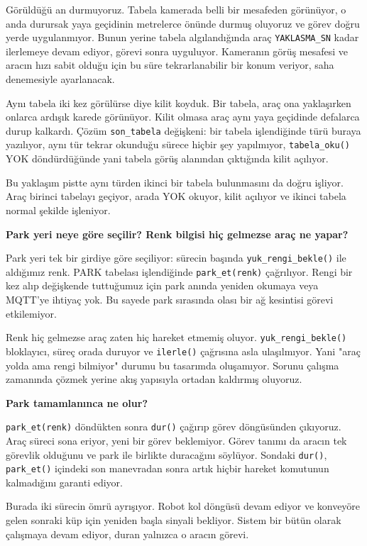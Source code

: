 \documentclass[11pt,a4paper]{article}
\newcommand{\ey}[1]{\texttt{#1}}
\begin{document}
Görüldüğü an durmuyoruz. Tabela kamerada belli bir mesafeden görünüyor, o anda
durursak yaya geçidinin metrelerce önünde durmuş oluyoruz ve görev doğru yerde
uygulanmıyor. Bunun yerine tabela algılandığında araç \ey{YAKLASMA\_SN} kadar
ilerlemeye devam ediyor, görevi sonra uyguluyor. Kameranın görüş mesafesi ve
aracın hızı sabit olduğu için bu süre tekrarlanabilir bir konum veriyor, saha
denemesiyle ayarlanacak.

Aynı tabela iki kez görülürse diye kilit koyduk. Bir tabela, araç ona
yaklaşırken onlarca ardışık karede görünüyor. Kilit olmasa araç aynı yaya
geçidinde defalarca durup kalkardı. Çözüm \ey{son\_tabela} değişkeni: bir
tabela işlendiğinde türü buraya yazılıyor, aynı tür tekrar okunduğu sürece
hiçbir şey yapılmıyor, \ey{tabela\_oku()} YOK döndürdüğünde yani tabela görüş
alanından çıktığında kilit açılıyor.

Bu yaklaşım pistte aynı türden ikinci bir tabela bulunmasını da doğru işliyor.
Araç birinci tabelayı geçiyor, arada YOK okuyor, kilit açılıyor ve ikinci tabela
normal şekilde işleniyor.

\textbf{Park yeri neye göre seçilir? Renk bilgisi hiç gelmezse araç ne yapar?}

Park yeri tek bir girdiye göre seçiliyor: sürecin başında
\ey{yuk\_rengi\_bekle()} ile aldığımız renk. PARK tabelası işlendiğinde
\ey{park\_et(renk)} çağrılıyor. Rengi bir kez alıp değişkende tuttuğumuz için
park anında yeniden okumaya veya MQTT'ye ihtiyaç yok. Bu sayede park sırasında
olası bir ağ kesintisi görevi etkilemiyor.

Renk hiç gelmezse araç zaten hiç hareket etmemiş oluyor.
\ey{yuk\_rengi\_bekle()} bloklayıcı, süreç orada duruyor ve \ey{ilerle()}
çağrısına asla ulaşılmıyor. Yani "araç yolda ama rengi bilmiyor" durumu bu
tasarımda oluşamıyor. Sorunu çalışma zamanında çözmek yerine akış yapısıyla
ortadan kaldırmış oluyoruz.

\textbf{Park tamamlanınca ne olur?}

\ey{park\_et(renk)} döndükten sonra \ey{dur()} çağırıp görev döngüsünden
çıkıyoruz. Araç süreci sona eriyor, yeni bir görev beklemiyor. Görev tanımı da
aracın tek görevlik olduğunu ve park ile birlikte duracağını söylüyor. Sondaki
\ey{dur()}, \ey{park\_et()} içindeki son manevradan sonra artık hiçbir hareket
komutunun kalmadığını garanti ediyor.

Burada iki sürecin ömrü ayrışıyor. Robot kol döngüsü devam ediyor ve konveyöre
gelen sonraki küp için yeniden başla sinyali bekliyor. Sistem bir bütün olarak
çalışmaya devam ediyor, duran yalnızca o aracın görevi.
\end{document}
